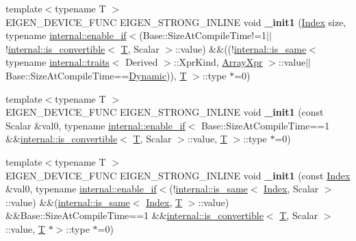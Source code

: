 \begin{DoxyCompactItemize}
\item 
\mbox{\label{class_eigen_1_1_plain_object_base_ae67658cea63893ac50e3809c533649ca}} 
{\footnotesize template$<$typename T $>$ }\\E\+I\+G\+E\+N\+\_\+\+D\+E\+V\+I\+C\+E\+\_\+\+F\+U\+NC E\+I\+G\+E\+N\+\_\+\+S\+T\+R\+O\+N\+G\+\_\+\+I\+N\+L\+I\+NE void {\bfseries \+\_\+init1} (\hyperlink{namespace_eigen_a62e77e0933482dafde8fe197d9a2cfde}{Index} size, typename \hyperlink{struct_eigen_1_1internal_1_1enable__if}{internal\+::enable\+\_\+if}$<$(Base\+::\+Size\+At\+Compile\+Time!=1$\vert$$\vert$!\hyperlink{struct_eigen_1_1internal_1_1is__convertible}{internal\+::is\+\_\+convertible}$<$ \hyperlink{group___sparse_core___module}{T}, Scalar $>$\+::value) \&\&((!\hyperlink{struct_eigen_1_1internal_1_1is__same}{internal\+::is\+\_\+same}$<$ typename \hyperlink{struct_eigen_1_1internal_1_1traits}{internal\+::traits}$<$ Derived $>$\+::Xpr\+Kind, \hyperlink{struct_eigen_1_1_array_xpr}{Array\+Xpr} $>$\+::value$\vert$$\vert$Base\+::\+Size\+At\+Compile\+Time==\hyperlink{namespace_eigen_ad81fa7195215a0ce30017dfac309f0b2}{Dynamic})), \hyperlink{group___sparse_core___module}{T} $>$\+::type $\ast$=0)
\item 
\mbox{\label{class_eigen_1_1_plain_object_base_aaaad53bc947ff3a17af1eedbdeb3a788}} 
{\footnotesize template$<$typename T $>$ }\\E\+I\+G\+E\+N\+\_\+\+D\+E\+V\+I\+C\+E\+\_\+\+F\+U\+NC E\+I\+G\+E\+N\+\_\+\+S\+T\+R\+O\+N\+G\+\_\+\+I\+N\+L\+I\+NE void {\bfseries \+\_\+init1} (const Scalar \&val0, typename \hyperlink{struct_eigen_1_1internal_1_1enable__if}{internal\+::enable\+\_\+if}$<$ Base\+::\+Size\+At\+Compile\+Time==1 \&\&\hyperlink{struct_eigen_1_1internal_1_1is__convertible}{internal\+::is\+\_\+convertible}$<$ \hyperlink{group___sparse_core___module}{T}, Scalar $>$\+::value, \hyperlink{group___sparse_core___module}{T} $>$\+::type $\ast$=0)
\item 
\mbox{\label{class_eigen_1_1_plain_object_base_ae7f0019cd985508d564a4ecad568578b}} 
{\footnotesize template$<$typename T $>$ }\\E\+I\+G\+E\+N\+\_\+\+D\+E\+V\+I\+C\+E\+\_\+\+F\+U\+NC E\+I\+G\+E\+N\+\_\+\+S\+T\+R\+O\+N\+G\+\_\+\+I\+N\+L\+I\+NE void {\bfseries \+\_\+init1} (const \hyperlink{namespace_eigen_a62e77e0933482dafde8fe197d9a2cfde}{Index} \&val0, typename \hyperlink{struct_eigen_1_1internal_1_1enable__if}{internal\+::enable\+\_\+if}$<$(!\hyperlink{struct_eigen_1_1internal_1_1is__same}{internal\+::is\+\_\+same}$<$ \hyperlink{namespace_eigen_a62e77e0933482dafde8fe197d9a2cfde}{Index}, Scalar $>$\+::value) \&\&(\hyperlink{struct_eigen_1_1internal_1_1is__same}{internal\+::is\+\_\+same}$<$ \hyperlink{namespace_eigen_a62e77e0933482dafde8fe197d9a2cfde}{Index}, \hyperlink{group___sparse_core___module}{T} $>$\+::value) \&\&Base\+::\+Size\+At\+Compile\+Time==1 \&\&\hyperlink{struct_eigen_1_1internal_1_1is__convertible}{internal\+::is\+\_\+convertible}$<$ \hyperlink{group___sparse_core___module}{T}, Scalar $>$\+::value, \hyperlink{group___sparse_core___module}{T} $\ast$$>$\+::type $\ast$=0)
$$
\end{DoxyCompactItemize}
